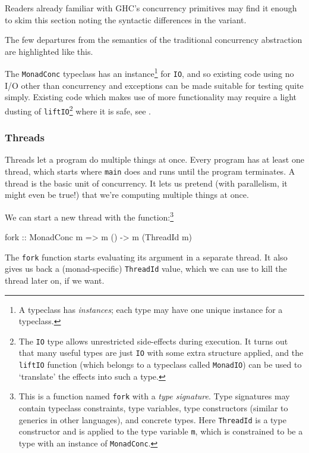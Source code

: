 Readers already familiar with GHC's concurrency primitives may find it
enough to skim this section noting the syntactic differences in the
\dejafu{} variant.

\begin{departure}
  The few departures from the semantics of the traditional concurrency
  abstraction are highlighted like this.
\end{departure}

The \verb|MonadConc| typeclass has an instance\footnote{A typeclass
  has \emph{instances}; each type may have one unique instance for a
  typeclass.} for \verb|IO|, and so existing code using no I/O other
than concurrency and exceptions can be made suitable for testing quite
simply. Existing code which makes use of more functionality may
require a light dusting of \verb|liftIO|\footnote{The \texttt{IO} type
  allows unrestricted side-effects during execution. It turns out that
  many useful types are just \texttt{IO} with some extra structure
  applied, and the \texttt{liftIO} function (which belongs to a
  typeclass called \texttt{MonadIO}) can be used to `translate' the
  effects into such a type.} where it is safe, see
.

\subsubsection{Threads}
\label{sec:abstraction-typeclass-threads}

Threads let a program do multiple things at once. Every program has at
least one thread, which starts where \verb|main| does and runs until
the program terminates. A thread is the basic unit of concurrency. It
lets us pretend (with parallelism, it might even be true!) that we're
computing multiple things at once.

We can start a new thread with the function:\footnote{This is a
  function named \texttt{fork} with a \emph{type signature}. Type
  signatures may contain typeclass constraints, type variables, type
  constructors (similar to generics in other languages), and concrete
  types. Here \texttt{ThreadId} is a type constructor and is applied
  to the type variable \texttt{m}, which is constrained to be a type
  with an instance of \texttt{MonadConc}.}

\begin{haskellcode}
fork :: MonadConc m => m () -> m (ThreadId m)
\end{haskellcode}

The \verb|fork| function starts evaluating its argument in a separate
thread. It also gives us back a (monad-specific) \verb|ThreadId|
value, which we can use to kill the thread later on, if we want.

